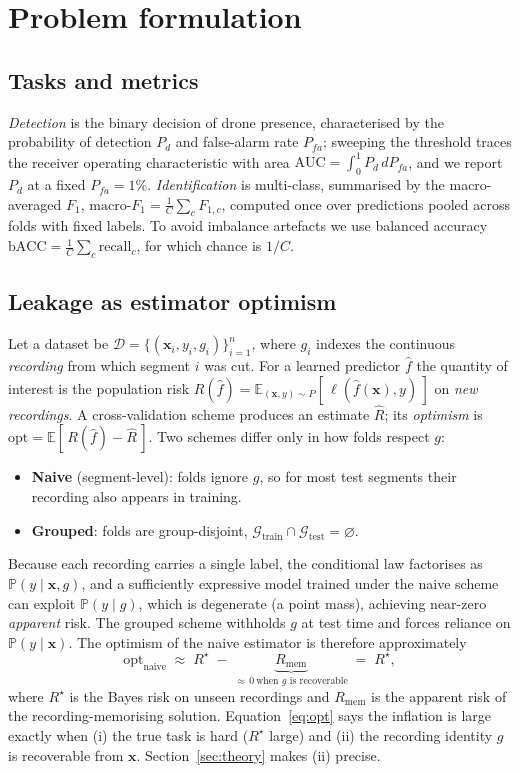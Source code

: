 \documentclass[11pt]{article}
\newcommand{\E}{\mathbb{E}}
\renewcommand{\Pr}{\mathbb{P}}
\begin{document}
\section{Problem formulation}
\label{sec:formal}
\subsection{Tasks and metrics}
\emph{Detection} is the binary decision of drone presence, characterised by the probability of detection $P_d$ and false-alarm rate $P_{fa}$; sweeping the threshold traces the receiver operating characteristic with area $\mathrm{AUC}=\int_0^1 P_d\,dP_{fa}$, and we report $P_d$ at a fixed $P_{fa}=1\%$. \emph{Identification} is multi-class, summarised by the macro-averaged $F_1$, $\mathrm{macro\text{-}}F_1=\frac{1}{C}\sum_{c}F_{1,c}$, computed once over predictions pooled across folds with fixed labels. To avoid imbalance artefacts we use balanced accuracy $\mathrm{bACC}=\frac{1}{C}\sum_{c}\mathrm{recall}_c$, for which chance is $1/C$.

\subsection{Leakage as estimator optimism}
Let a dataset be $\mathcal{D}=\{(\mathbf{x}_i,y_i,g_i)\}_{i=1}^{n}$, where $g_i$ indexes the continuous \emph{recording} from which segment $i$ was cut. For a learned predictor $\hat f$ the quantity of interest is the population risk $R(\hat f)=\E_{(\mathbf{x},y)\sim P}[\,\ell(\hat f(\mathbf{x}),y)\,]$ on \emph{new recordings}. A cross-validation scheme produces an estimate $\hat R$; its \emph{optimism} is $\mathrm{opt}=\E[\,R(\hat f)-\hat R\,]$. Two schemes differ only in how folds respect $g$:
\begin{itemize}
\item \textbf{Naive} (segment-level): folds ignore $g$, so for most test segments their recording also appears in training.
\item \textbf{Grouped}: folds are group-disjoint, $\mathcal{G}_{\mathrm{train}}\cap\mathcal{G}_{\mathrm{test}}=\varnothing$.
\end{itemize}
Because each recording carries a single label, the conditional law factorises as $\Pr(y\mid \mathbf{x},g)$, and a sufficiently expressive model trained under the naive scheme can exploit $\Pr(y\mid g)$, which is degenerate (a point mass), achieving near-zero \emph{apparent} risk. The grouped scheme withholds $g$ at test time and forces reliance on $\Pr(y\mid \mathbf{x})$. The optimism of the naive estimator is therefore approximately
\begin{equation}
\mathrm{opt}_{\mathrm{naive}} \;\approx\; R^\star \;-\; \underbrace{R_{\mathrm{mem}}}_{\approx\,0\ \text{when $g$ is recoverable}} \;=\; R^\star,
\label{eq:opt}
\end{equation}
where $R^\star$ is the Bayes risk on unseen recordings and $R_{\mathrm{mem}}$ is the apparent risk of the recording-memorising solution. Equation~\eqref{eq:opt} says the inflation is large exactly when (i) the true task is hard ($R^\star$ large) and (ii) the recording identity $g$ is recoverable from $\mathbf{x}$. Section~\ref{sec:theory} makes (ii) precise.
\end{document}
